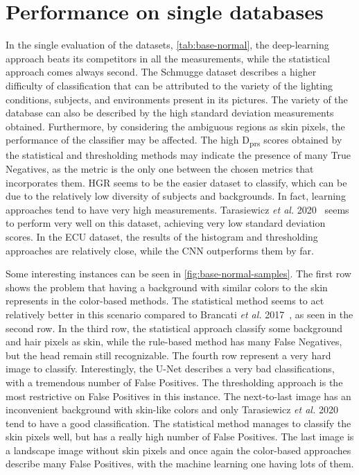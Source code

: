\FloatBarrier
\section{Performance on single databases}

In the single evaluation of the datasets, \autoref{tab:base-normal}, the deep-learning approach beats its competitors in all the measurements, while the statistical approach comes always second.
The Schmugge dataset describes a higher difficulty of classification that can be attributed to the variety of the lighting conditions, subjects, and environments present in its pictures.
The variety of the database can also be described by the high standard deviation measurements obtained.
Furthermore, by considering the ambiguous regions as skin pixels, the performance of the classifier may be affected.
The high D\textsubscript{prs} scores obtained by the statistical and thresholding methods may indicate the presence of many True Negatives, as the metric is the only one between the chosen metrics that incorporates them.
HGR seems to be the easier dataset to classify, which can be due to the relatively low diversity of subjects and backgrounds. In fact, learning approaches tend to have very high measurements.
Tarasiewicz \textit{et al.} 2020~\cite{tarasiewicz2020skinny} seems to perform very well on this dataset, achieving very low standard deviation scores.
In the ECU dataset, the results of the histogram and thresholding approaches are relatively close, while the CNN outperforms them by far.

Some interesting instances can be seen in \autoref{fig:base-normal-samples}.
The first row shows the problem that having a background with similar colors to the skin represents in the color-based methods.
The statistical method seems to act relatively better in this scenario compared to Brancati \textit{et al.} 2017~\cite{brancati2017human}, as seen in the second row.
In the third row, the statistical approach classify some background and hair pixels as skin, while the rule-based method has many False Negatives, but the head remain still recognizable.
The fourth row represent a very hard image to classify.
Interestingly, the U-Net describes a very bad classifications, with a tremendous number of False Positives.
The thresholding approach is the most restrictive on False Positives in this instance.
The next-to-last image has an inconvenient background with skin-like colors and only Tarasiewicz \textit{et al.} 2020~\cite{tarasiewicz2020skinny} tend to have a good classification.
The statistical method manages to classify the skin pixels well, but has a really high number of False Positives.
The last image is a landscape image without skin pixels and once again the color-based approaches describe many False Positives, with the machine learning one having lots of them.

